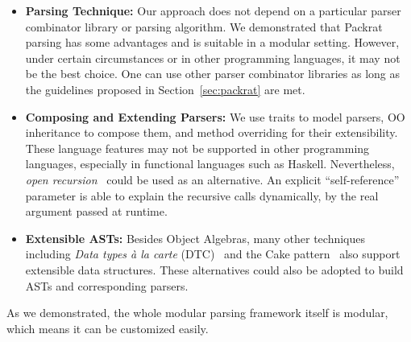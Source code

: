 \begin{itemize}[leftmargin=*]

\item {\bf Parsing Technique:}
Our approach does not depend on a particular parser combinator library
or parsing algorithm. We demonstrated that Packrat parsing has some
advantages and is suitable in a modular setting. However, under
certain circumstances or in other programming languages, it may not be
the best choice. One can use other parser combinator libraries as long
as the guidelines proposed in Section~\ref{sec:packrat} are met.

\item {\bf Composing and Extending Parsers:}
  We use traits to model parsers, OO inheritance to compose them, and
  method overriding for their extensibility. These language features
  may not be supported in other programming languages, especially in
  functional languages such as Haskell. Nevertheless, \textit{open
    recursion}~\cite{CookThesis} could be used as an alternative. An explicit
  ``self-reference'' parameter is able to explain the recursive calls
  dynamically, by the real argument passed at runtime.

\item {\bf Extensible ASTs:}
Besides Object Algebras, many other techniques including \textit{Data
  types à la carte} (DTC)~\cite{swierstra2008data} and the Cake pattern~\cite{odersky2005independently} also support extensible data structures. These alternatives could also be adopted to build ASTs and corresponding parsers.

\end{itemize}

As we demonstrated, the whole modular parsing framework itself is
modular, which means it can be customized easily.
